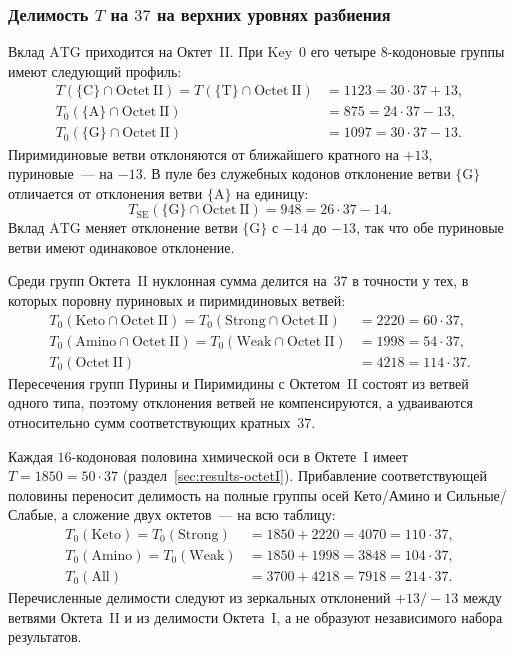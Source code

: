 \documentclass[11pt,a4paper]{article}
\renewcommand{\_}{\origunderscore\allowbreak}
\begin{document}
\subsubsection{Делимость \texorpdfstring{$T$}{T} на
\texorpdfstring{$37$}{37} на верхних уровнях разбиения}

Вклад $\mathrm{ATG}$ приходится на Октет~II. При Key~0 его четыре
$8$-кодоновые группы имеют следующий профиль:
\[
\begin{aligned}
T(\{\mathrm{C}\}\cap\mathrm{Octet~II})
  =T(\{\mathrm{T}\}\cap\mathrm{Octet~II})
  &=1123=30\cdot37+13, \\
T_{0}(\{\mathrm{A}\}\cap\mathrm{Octet~II})
  &=875=24\cdot37-13, \\
T_{0}(\{\mathrm{G}\}\cap\mathrm{Octet~II})
  &=1097=30\cdot37-13.
\end{aligned}
\]
Пиримидиновые ветви отклоняются от ближайшего кратного на $+13$,
пуриновые~--- на $-13$. В пуле без служебных кодонов отклонение
ветви $\{\mathrm{G}\}$ отличается от отклонения ветви
$\{\mathrm{A}\}$ на единицу:
\[
T_{\mathrm{SE}}(\{\mathrm{G}\}\cap\mathrm{Octet~II})
  =948=26\cdot37-14.
\]
Вклад $\mathrm{ATG}$ меняет отклонение ветви $\{\mathrm{G}\}$ с
$-14$ до $-13$, так что обе пуриновые ветви имеют одинаковое
отклонение.

Среди групп Октета~II нуклонная сумма делится на~$37$ в точности у
тех, в которых поровну пуриновых и пиримидиновых ветвей:
\[
\begin{aligned}
T_{0}(\mathrm{Keto}\cap\mathrm{Octet~II})
  =T_{0}(\mathrm{Strong}\cap\mathrm{Octet~II})
  &=2220=60\cdot37, \\
T_{0}(\mathrm{Amino}\cap\mathrm{Octet~II})
  =T_{0}(\mathrm{Weak}\cap\mathrm{Octet~II})
  &=1998=54\cdot37, \\
T_{0}(\mathrm{Octet~II})
  &=4218=114\cdot37.
\end{aligned}
\]
Пересечения групп Пурины и Пиримидины с Октетом~II состоят из
ветвей одного типа, поэтому отклонения ветвей не компенсируются, а
удваиваются относительно сумм соответствующих кратных~$37$.

Каждая $16$-кодоновая половина химической оси в Октете~I имеет
$T=1850=50\cdot37$ (раздел~\ref{sec:results-octetI}). Прибавление
соответствующей половины переносит делимость на полные группы осей
Кето/Амино и Сильные/Слабые, а сложение двух октетов~--- на всю
таблицу:
\[
\begin{aligned}
T_{0}(\mathrm{Keto})=T_{0}(\mathrm{Strong})
  &=1850+2220=4070=110\cdot37, \\
T_{0}(\mathrm{Amino})=T_{0}(\mathrm{Weak})
  &=1850+1998=3848=104\cdot37, \\
T_{0}(\mathrm{All})
  &=3700+4218=7918=214\cdot37.
\end{aligned}
\]
Перечисленные делимости следуют из зеркальных отклонений $+13/-13$
между ветвями Октета~II и из делимости Октета~I, а не образуют
независимого набора результатов.
\end{document}
